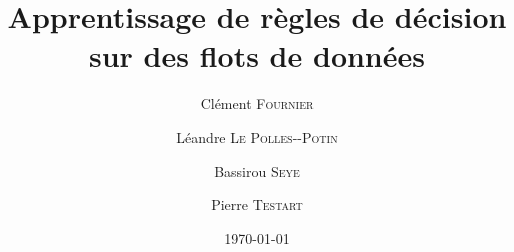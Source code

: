 \documentclass[a4paper,12pt,twoside]{report}
\title{Apprentissage de règles de décision sur des flots de données}
\date{\today}
\author{
	Clément \textsc{Fournier} \and
	Léandre \textsc{Le Polles-{-}Potin} \and
	Bassirou \textsc{Seye} \and
	Pierre \textsc{Testart}
}
\begin{document}
	
		
  	 
	
	
  	
  	
	
    \cleardoublepage 
	\nocite{*}
	
	
              
\end{document}

